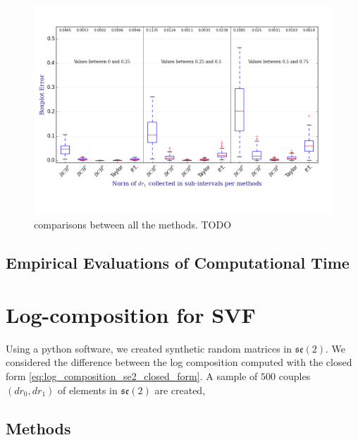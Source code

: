 \begin{figure}[!ht]
	\hspace{-2cm}
	\includegraphics[scale=0.75]{figures/se2_boxplot.png}
	\caption{comparisons between all the methods. TODO}
	\label{fig:se2_boxplot}
\end{figure}


\subsection{Empirical Evaluations of Computational Time}


\section{Log-composition for SVF}
Using a python software, we created synthetic random matrices in $\mathfrak{se}(2)$. We considered the difference between the log composition computed with the closed form \ref{eq:log_composition_se2_closed_form}. 
A sample of $500$ couples $(dr_0,dr_1)$ of elements in $\mathfrak{se}(2)$ are created, 


\subsection{Methods}

